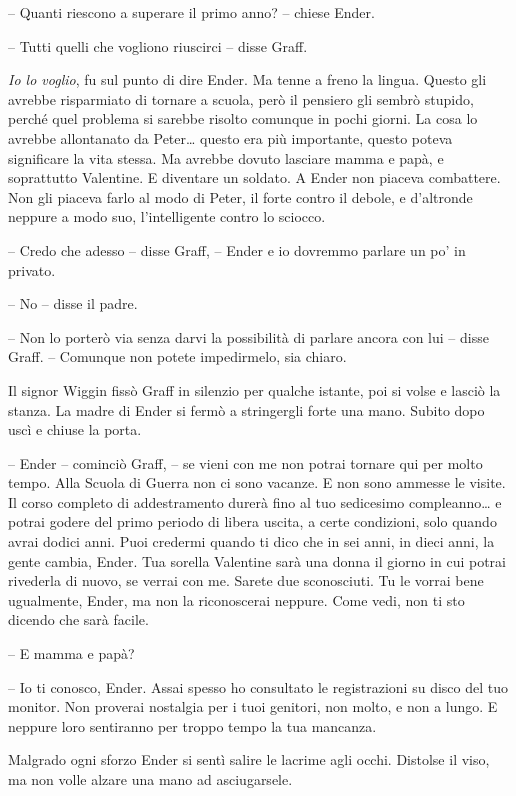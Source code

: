 {-- Quanti riescono a superare il primo anno? -- chiese Ender.}

{-- Tutti quelli che vogliono riuscirci -- disse Graff.}

\emph{{Io lo voglio}}{, \emph{} fu sul punto di dire Ender. Ma tenne a
	freno la lingua. Questo gli avrebbe risparmiato di tornare a scuola,
	però il pensiero gli sembrò stupido, perché quel problema si sarebbe
	risolto comunque in pochi giorni. La cosa lo avrebbe allontanato da
	Peter\ldots{} questo era più importante, questo poteva significare la
	vita stessa. Ma avrebbe dovuto lasciare mamma e papà, e soprattutto
	Valentine. E diventare un soldato. A Ender non piaceva combattere. Non
	gli piaceva farlo al modo di Peter, il forte contro il debole, e
	d'altronde neppure a modo suo, l'intelligente contro lo sciocco.}

{-- Credo che adesso -- disse Graff, -- Ender e io dovremmo parlare un
	po' in privato.}

{-- No -- disse il padre.}

{-- Non lo porterò via senza darvi la possibilità di parlare ancora con
	lui -- disse Graff. -- Comunque non potete impedirmelo, sia chiaro.}

{Il signor Wiggin fissò Graff in silenzio per qualche istante, poi si
	volse e lasciò la stanza. La madre di Ender si fermò a stringergli forte
	una mano. Subito dopo uscì e chiuse la porta.}

{-- Ender -- cominciò Graff, -- se vieni con me non potrai tornare qui
	per molto tempo. Alla Scuola di Guerra non ci sono vacanze. E non sono
	ammesse le visite. Il corso completo di addestramento durerà fino al tuo
	sedicesimo compleanno\ldots{} e potrai godere del primo periodo di
	libera uscita, a certe condizioni, solo quando avrai dodici anni. Puoi
	credermi quando ti dico che in sei anni, in dieci anni, la gente cambia,
	Ender. Tua sorella Valentine sarà una donna il giorno in cui potrai
	rivederla di nuovo, se verrai con me. Sarete due sconosciuti. Tu le
	vorrai bene ugualmente, Ender, ma non la riconoscerai neppure. Come
	vedi, non ti sto dicendo che sarà facile.}

{-- E mamma e papà?}

{-- Io ti conosco, Ender. Assai spesso ho consultato le registrazioni su
	disco del tuo monitor. Non proverai nostalgia per i tuoi genitori, non
	molto, e non a lungo. E neppure loro sentiranno per troppo tempo la tua
	mancanza.}

{Malgrado ogni sforzo Ender si sentì salire le lacrime agli occhi.
	Distolse il viso, ma non volle alzare una mano ad asciugarsele.}

